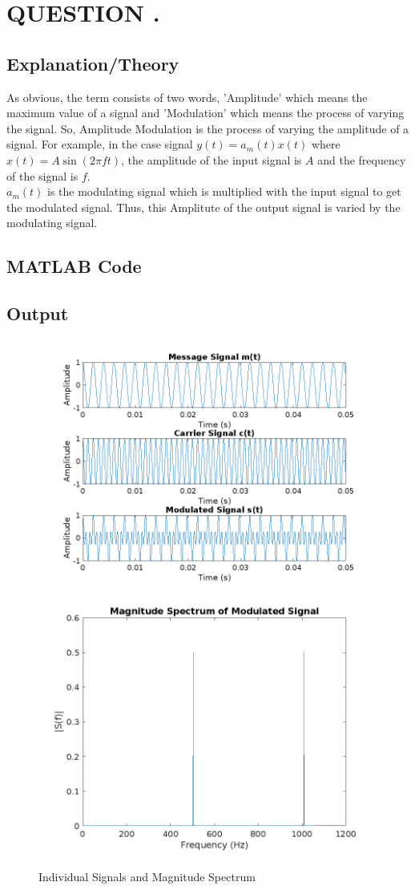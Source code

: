 \section*{QUESTION \quesNo.}

\subsection*{Explanation/Theory}

As obvious, the term consists of two words, 
'Amplitude' which means the maximum value of a signal and 
'Modulation' which means the process of varying the signal. 
So, Amplitude Modulation is the process of varying the amplitude of a signal. 
For example, in the case signal $y(t) = a_m(t)x(t)$ where $x(t) = A \sin(2\pi f t)$,
the amplitude of the input signal is $A$ and the frequency of the signal is $f$. \\
$a_m(t)$ is the modulating signal which is multiplied with the input signal to get the modulated signal.
Thus, this Amplitute of the output signal is varied by the modulating signal.


\subsection*{MATLAB Code}




\subsection*{Output}
\begin{figure}[H]
    \centering
    \includegraphics[width = .49\textwidth]{./imgs/1_individual_signals.png}\hfill
    \includegraphics[width = .49\textwidth]{./imgs/1_magnitude_spectrum.png}
    \caption{Individual Signals and Magnitude Spectrum}
\end{figure}


